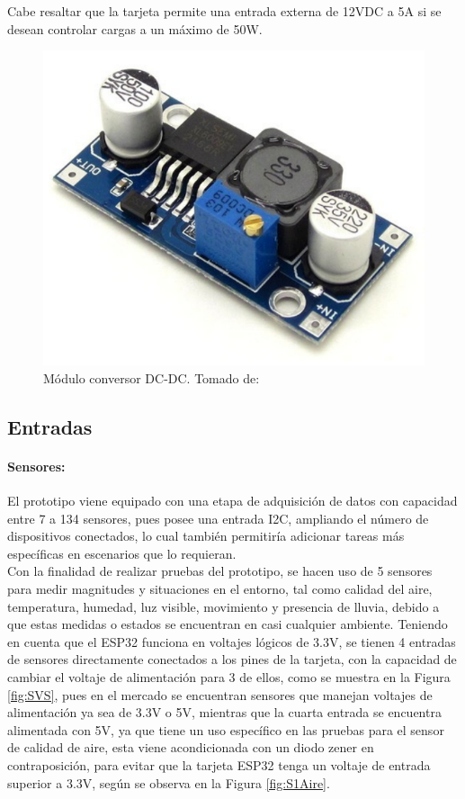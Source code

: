 		Cabe resaltar que la tarjeta permite una entrada externa de 12VDC a 5A si se desean controlar cargas a un máximo de 50W.\\
			
		\begin{figure}[H]
			\centering
			\caption[Módulo conversor DC-DC.]{Módulo conversor DC-DC. Tomado de: \cite{DCDC}}
			\label{fig:DCDC}
			\includegraphics[width=0.5\linewidth]{Imagenes/DCDC}
		\end{figure}
	
	\subsection{Entradas}
	\paragraph{Sensores:}
		El prototipo viene equipado con una etapa de adquisición de datos con capacidad entre 7 a 134 sensores, pues posee una entrada I2C, ampliando el número de dispositivos conectados, lo cual también permitiría adicionar tareas más específicas en escenarios que lo requieran.\\
		
		Con la finalidad de realizar pruebas del prototipo, se hacen uso de 5 sensores para medir magnitudes y situaciones en el entorno, tal como calidad del aire, temperatura, humedad, luz visible, movimiento y presencia de lluvia, debido a que estas medidas o estados se encuentran en casi cualquier ambiente. Teniendo en cuenta que el ESP32 funciona en voltajes lógicos de 3.3V, se tienen 4 entradas de sensores directamente conectados a los pines de la tarjeta, con la capacidad de cambiar el voltaje de alimentación para 3 de ellos, como se muestra en la Figura \ref{fig:SVS}, pues en el mercado se encuentran sensores que manejan voltajes de alimentación ya sea de 3.3V o 5V, mientras que la cuarta entrada se encuentra alimentada con 5V, ya que tiene un uso específico en las pruebas para el sensor de calidad de aire, esta viene acondicionada con un diodo zener en contraposición, para evitar que la tarjeta ESP32 tenga un voltaje de entrada superior a 3.3V, según se observa en la Figura \ref{fig:S1Aire}.\\
		
